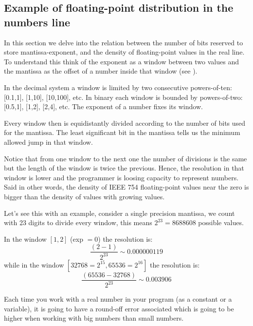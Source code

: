         \subsection{Example of floating-point distribution in the numbers line}


In this section we delve into the relation between the number of bits reserved to store mantissa-exponent, 
and the density of floating-point values in the real line.
To understand this think of the exponent as a window between two values and the 
mantissa as the offset of a number inside that window (see \cite{VisExpl}).
 
In the decimal system a window is limited by two consecutive powers-of-ten: [0.1,1], [1,10], [10,100], etc. 
In binary each window is bounded by powers-of-two: [0.5,1], [1,2], [2,4], etc. The exponent of a number 
fixes its window. 

Every window then is equidistantly divided according to the number of bits used for the mantissa. The least significant bit 
in the mantissa tells us the minimum allowed jump in that window. 

Notice that from one window to the next one the number of divisions is the same but the length of the window is twice the previous.
Hence, the resolution in that window is lower and the programmer is loosing capacity to represent numbers. 
Said in other words, the density of IEEE 754 floating-point values near the zero is bigger than 
the density of values with growing values. 



Let's see this with an example, consider a single precision mantissa, we count with 23 digits to divide every window, 
this means $2^{23} = 8688608$ possible values. 

In the window $\left[1,2\right]$ (exp $= 0$) the resolution is:
$$
\frac{\left(2-1\right)}{2^{23}} \sim 0.000000119
$$ 
while in the window $\left[32768=2^{15},65536=2^{16}\right]$ the resolution is:
$$
\frac{\left(65536-32768\right)}{2^{23}} \sim 0.003906
$$

Each time you work with a real number in your program (as a constant or a variable), it is going to have a round-off error associated 
which is going to be higher when working with big numbers than small numbers. 




